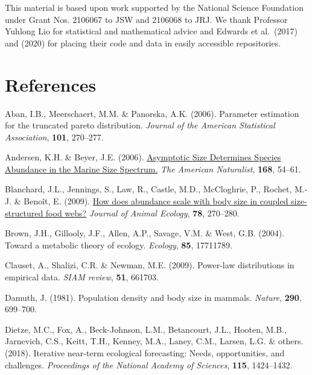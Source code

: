 \documentclass[
  12pt,
]{article}
\newlength{\cslhangindent}
\newlength{\cslentryspacingunit} %
\newenvironment{CSLReferences}[2] %
 {%
  \setlength{\parindent}{0pt}
  \ifodd #1
  \let\oldpar\par
  \def\par{\hangindent=\cslhangindent\oldpar}
  \fi
  \setlength{\parskip}{#2\cslentryspacingunit}
 }%
 {}
\begin{document}
This material is based upon work supported by the National Science
Foundation under Grant Nos. 2106067 to JSW and 2106068 to JRJ. We thank
Professor Yuhlong Lio for statistical and mathematical advice and
Edwards et al.~(2017) and (2020) for placing their code and data in
easily accessible repositories.

\hypertarget{references}{%
\section{References}\label{references}}

\hypertarget{refs}{}
\begin{CSLReferences}{1}{0}
\leavevmode{}%
Aban, I.B., Meerschaert, M.M. \& Panorska, A.K. (2006). Parameter
estimation for the truncated pareto distribution. \emph{Journal of the
American Statistical Association}, \textbf{101}, 270--277.

\leavevmode{}%
Andersen, K.H. \& Beyer, J.E. (2006).
\href{https://doi.org/10.1086/504849}{Asymptotic {Size Determines
Species Abundance} in the {Marine Size Spectrum}.} \emph{The American
Naturalist}, \textbf{168}, 54--61.

\leavevmode{}%
Blanchard, J.L., Jennings, S., Law, R., Castle, M.D., McCloghrie, P.,
Rochet, M.-J. \& Benoît, E. (2009).
\href{https://doi.org/10.1111/j.1365-2656.2008.01466.x}{How does
abundance scale with body size in coupled size-structured food webs?}
\emph{Journal of Animal Ecology}, \textbf{78}, 270--280.

\leavevmode{}%
Brown, J.H., Gillooly, J.F., Allen, A.P., Savage, V.M. \& West, G.B.
(2004). Toward a metabolic theory of ecology. \emph{Ecology},
\textbf{85}, 17711789.

\leavevmode{}%
Clauset, A., Shalizi, C.R. \& Newman, M.E. (2009). Power-law
distributions in empirical data. \emph{SIAM review}, \textbf{51},
661703.

\leavevmode{}%
Damuth, J. (1981). Population density and body size in mammals.
\emph{Nature}, \textbf{290}, 699--700.

\leavevmode{}%
Dietze, M.C., Fox, A., Beck-Johnson, L.M., Betancourt, J.L., Hooten,
M.B., Jarnevich, C.S., Keitt, T.H., Kenney, M.A., Laney, C.M., Larsen,
L.G. \& others. (2018). Iterative near-term ecological forecasting:
Needs, opportunities, and challenges. \emph{Proceedings of the National
Academy of Sciences}, \textbf{115}, 1424--1432.


\end{CSLReferences}
\end{document}
